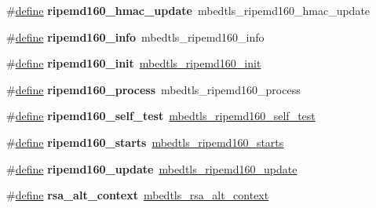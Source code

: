 \begin{DoxyCompactItemize}
\mbox{\label{compat-1_83_8h_aebea09f3e025d8577b9694bee8dceabd}} 
\#\hyperlink{structdefine}{define} {\bfseries ripemd160\+\_\+hmac\+\_\+update}~mbedtls\+\_\+ripemd160\+\_\+hmac\+\_\+update
\item 
\mbox{\label{compat-1_83_8h_a99f806be251ed166acd7ab4171c0d89a}} 
\#\hyperlink{structdefine}{define} {\bfseries ripemd160\+\_\+info}~mbedtls\+\_\+ripemd160\+\_\+info
\item 
\mbox{\label{compat-1_83_8h_a0bbe693369a84bd6d9a9b1546c1da557}} 
\#\hyperlink{structdefine}{define} {\bfseries ripemd160\+\_\+init}~\hyperlink{ripemd160_8h_a650a9d62b92a35fbb461e10c5d11c546}{mbedtls\+\_\+ripemd160\+\_\+init}
\item 
\mbox{\label{compat-1_83_8h_af1ef0fe9d590fb92ae1a0d9ed3b6e45e}} 
\#\hyperlink{structdefine}{define} {\bfseries ripemd160\+\_\+process}~mbedtls\+\_\+ripemd160\+\_\+process
\item 
\mbox{\label{compat-1_83_8h_aff63a2a1b37339ca17cd0b28b0cbbc35}} 
\#\hyperlink{structdefine}{define} {\bfseries ripemd160\+\_\+self\+\_\+test}~\hyperlink{ripemd160_8h_a416da55879d0ab7366514a9dc75a9443}{mbedtls\+\_\+ripemd160\+\_\+self\+\_\+test}
\item 
\mbox{\label{compat-1_83_8h_a5253452524797621b2abf983a276007d}} 
\#\hyperlink{structdefine}{define} {\bfseries ripemd160\+\_\+starts}~\hyperlink{ripemd160_8h_a7c7ddc9200313207235753d1667e141e}{mbedtls\+\_\+ripemd160\+\_\+starts}
\item 
\mbox{\label{compat-1_83_8h_aa73b930a2f0a226903462d92f8d8d286}} 
\#\hyperlink{structdefine}{define} {\bfseries ripemd160\+\_\+update}~\hyperlink{ripemd160_8h_a57d66504c6c3a3677443f5511917498d}{mbedtls\+\_\+ripemd160\+\_\+update}
\item 
\mbox{\label{compat-1_83_8h_a07acfe5ff08e4652514afdc1673a7333}} 
\#\hyperlink{structdefine}{define} {\bfseries rsa\+\_\+alt\+\_\+context}~\hyperlink{structmbedtls__rsa__alt__context}{mbedtls\+\_\+rsa\+\_\+alt\+\_\+context}
\item 
\mbox{\label{compat-1_83_8h_a80d9047354fb412e1c44cad683ba3ab5}} 

\end{DoxyCompactItemize}
